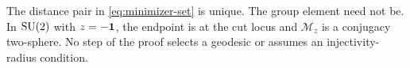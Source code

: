\begin{remark}\label{rem:nonunique-minimizers}
The distance pair in \eqref{eq:minimizer-set} is unique.  The group element
need not be.  In $\mathrm{SU}(2)$ with $z=-\mathbf 1$, the endpoint is at the cut locus
and $\mathcal M_z$ is a conjugacy two-sphere.  No step of the proof selects a
geodesic or assumes an injectivity-radius condition.
\end{remark}
